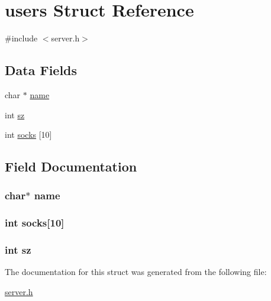 \hypertarget{structusers}{\section{users Struct Reference}
\label{structusers}
}


{\ttfamily \#include $<$server.\+h$>$}

\subsection*{Data Fields}
\begin{DoxyCompactItemize}
\item 
char $\ast$ \hyperlink{structusers_a5ac083a645d964373f022d03df4849c8}{name}
\item 
int \hyperlink{structusers_a0e1ea19fb9fa7881d15d84eff4c090e1}{sz}
\item 
int \hyperlink{structusers_af0ec14b86015b7b20e9e7ac342c19044}{socks} \mbox{[}10\mbox{]}
\end{DoxyCompactItemize}


\subsection{Field Documentation}
\hypertarget{structusers_a5ac083a645d964373f022d03df4849c8}{
\subsubsection[{name}]{\setlength{\rightskip}{0pt plus 5cm}char$\ast$ name}}\label{structusers_a5ac083a645d964373f022d03df4849c8}
\hypertarget{structusers_af0ec14b86015b7b20e9e7ac342c19044}{
\subsubsection[{socks}]{\setlength{\rightskip}{0pt plus 5cm}int socks\mbox{[}10\mbox{]}}}\label{structusers_af0ec14b86015b7b20e9e7ac342c19044}
\hypertarget{structusers_a0e1ea19fb9fa7881d15d84eff4c090e1}{
\subsubsection[{sz}]{\setlength{\rightskip}{0pt plus 5cm}int sz}}\label{structusers_a0e1ea19fb9fa7881d15d84eff4c090e1}


The documentation for this struct was generated from the following file\+:\begin{DoxyCompactItemize}
\item 
\hyperlink{server_8h}{server.\+h}\end{DoxyCompactItemize}

